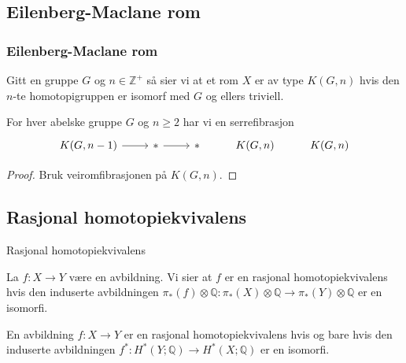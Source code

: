 \documentclass[UKenglish]{beamer}
\begin{document}
\subsection{Eilenberg-Maclane rom}

\begin{frame}[t]
    \frametitle{Eilenberg-Maclane rom}
   \begin{definition}
      Gitt en gruppe \( G \) og \( n\in \mathbb{Z}^+ \) så sier vi at
      et rom \( X \) er av type \( K(G, n) \) hvis den \( n \)-te 
      homotopigruppen er isomorf med \( G \) og ellers triviell.
   \end{definition} 
    \pause
    \begin{proposition}
       For hver abelske gruppe \( G \) og \( n\geq 2 \) har vi en
       serrefibrasjon
       \begin{equation}
           \begin{tikzcd}
               {K(G,n-1)} & {*} & {*} & {K(G, n)} & {K(G,n)}
             \arrow[from=1-1, to=1-2]
             \arrow[from=1-2, to=1-3]
           \end{tikzcd}
       \end{equation}
    \end{proposition}
    \pause
    \begin{proof}
       Bruk veiromfibrasjonen på \( K(G, n) \). 
    \end{proof}
\end{frame}

\subsection{Rasjonal homotopiekvivalens}
\begin{frame}{Rasjonal homotopiekvivalens}
   \begin{definition}
      La \( f:X\rightarrow Y \) være en avbildning. Vi sier at \( f \) 
      er en rasjonal homotopiekvivalens hvis den induserte avbildningen
      \( \pi_*(f)\otimes\mathbb{Q}:\pi_*(X)\otimes\mathbb{Q}\rightarrow \pi_*(Y)\otimes\mathbb{Q} \) 
      er en isomorfi.
   \end{definition} 
    \pause
    \begin{theorem}[]
        En avbildning \( f:X\rightarrow Y \) er en rasjonal homotopiekvivalens
        hvis og bare hvis 
        den induserte avbildningen \( f^*:H^*(Y;\mathbb{Q})\rightarrow H^*(X;\mathbb{Q}) \) 
        er en isomorfi.
    \end{theorem}
    \pause
\end{frame}
\end{document}

